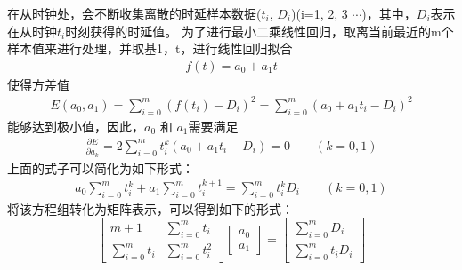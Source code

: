 

在从时钟处，会不断收集离散的时延样本数据($t_{i}$, $D_{i}$)(i=1, 2, 3 $\cdots$)，其中，$D_{i}$表示在从时钟$t_{i}$时刻获得的时延值。
为了进行最小二乘线性回归，取离当前最近的m个样本值来进行处理，并取基1，t，进行线性回归拟合
\begin {align}
f(t) = a_{0} + a_{1}t
\end{align}
使得方差值
\begin{align}
E(a_{0}, a_{1}) = \sum_{i=0}^{m}(f(t_{i}) - D_{i})^{2}
	= \sum_{i=0}^{m}(a_{0} + a_{1}t_{i} - D_{i})^{2}
\end{align}
能够达到极小值，因此，$a_{0}$ 和 $a_{1}$需要满足
\begin{align}
	\frac{\partial E}{\partial a_{k}} = 2 \sum_{i=0}^{m}t_{i}^{k}(a_{0} + a_{1}t_{i} - D_{i}) = 0
	\qquad(k = 0, 1)
\end{align}
上面的式子可以简化为如下形式：
\begin{align}
	a_{0}\sum_{i=0}^{m}t_{i}^{k} + a_{1}\sum_{i=0}^{m}t_{i}^{k+1} = \sum_{i=0}^{m}t_{i}^{k}D_{i}
	\qquad(k = 0, 1)
\end{align}
将该方程组转化为矩阵表示，可以得到如下的形式：
\begin{equation}
	\begin{bmatrix}
		m+1 & \sum_{i=0}^{m}t_{i} \\ 
		\sum_{i=0}^{m}t_{i} & \sum_{i=0}^{m}t_{i}^{2}
	\end{bmatrix}
	\begin{bmatrix}
	a_{0} \\ a_{1}
	\end{bmatrix}
	=
	\begin{bmatrix}
	 \sum_{i=0}^{m}D_{i} \\ \sum_{i=0}^{m}t_{i}D_{i}
	\end{bmatrix}
\end{equation}

